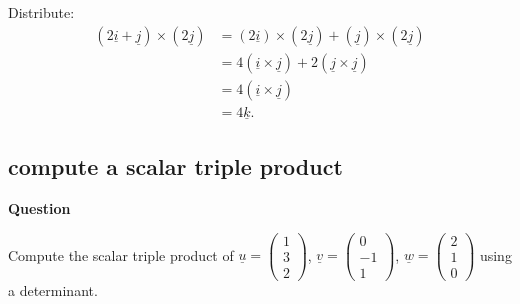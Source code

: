 \documentclass[12pt,letterpaper,noanswers]{exam}
\newcommand{\mb}[1]{\underline{#1}}
\begin{document}
\begin{questions}
    \item Distribute: \begin{align*}
    (2\mb{i}+\mb{j})\times(2\mb{j}) &= (2\mb{i})\times(2\mb{j})+ (\mb{j})\times(2\mb{j}) \\
    &= 4(\mb{i}\times \mb{j})+ 2(\mb{j}\times \mb{j}) \\
    &= 4(\mb{i}\times \mb{j}) \\
    &= 4\mb{k}.
    \end{align*}
\end{questions}

\subsection{compute a scalar triple product}

\noindent\textbf{Question}

Compute the scalar triple product of $\mb{u} = \left(\begin{array}{c}1 \\ 3\\ 2\end{array}\right)$, $\mb{v} =\left(\begin{array}{c}0 \\ -1\\ 1\end{array}\right)$, $\mb{w}=\left(\begin{array}{c} 2 \\ 1\\ 0\end{array}\right)$ using a determinant.
\end{document}
